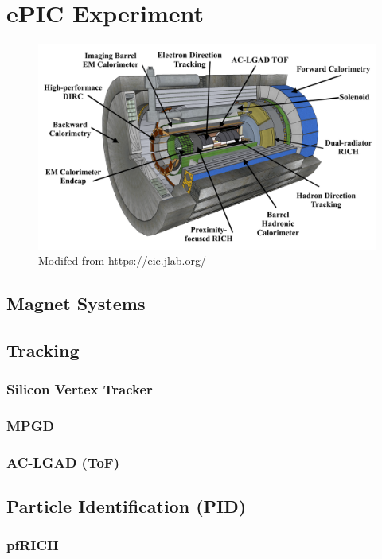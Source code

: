 \chapter{ePIC Experiment}\label{cha:epic} %

\begin{figure}[H]
    \centering
    \includegraphics[width=.9\linewidth]{img/ePIC_skp.png}
    \caption{Modifed from \url{https://eic.jlab.org/}}
    \label{fig:epic:epic}
\end{figure}

\section{Magnet Systems}

\section{Tracking}
\subsection{Silicon Vertex Tracker}
\subsection{MPGD}
\subsection{AC-LGAD (ToF)}

\section{Particle Identification (PID)}
\subsection{pfRICH}
